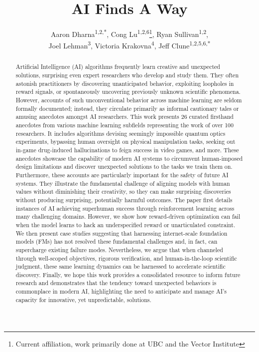 \documentclass[10pt]{article}
\title{AI Finds A Way}
\author{Aaron Dharna\textsuperscript{1,2,*}, Cong Lu\textsuperscript{1,2,6}\footnote[2]{Current affiliation, work primarily done at UBC and the Vector Institute}, 
Ryan Sullivan\textsuperscript{1,2},\\ 
Joel Lehman\textsuperscript{3}, Victoria Krakovna\textsuperscript{4}, Jeff Clune\textsuperscript{1,2,5,6\textdagger,*}}
\date{}
\begin{document}
\maketitle

\begin{abstract}
Artificial Intelligence (AI) algorithms frequently learn creative and unexpected solutions, surprising even expert researchers who develop and study them.
They often astonish practitioners by discovering unanticipated behavior, exploiting loopholes in reward signals, or spontaneously uncovering previously unknown scientific phenomena.
However, accounts of such unconventional behavior across machine learning are seldom formally documented; instead, they circulate primarily as informal cautionary tales or amusing anecdotes amongst AI researchers.
This work presents 26 curated firsthand anecdotes from various machine learning subfields representing the work of over 100 researchers.
It includes algorithms devising seemingly impossible quantum optics experiments,
bypassing human oversight on physical manipulation tasks, seeking out in-game drug-induced hallucinations to feign success in video games, and more.
These anecdotes showcase the capability of modern AI systems to circumvent human-imposed design limitations and discover unexpected solutions to the tasks we train them on.
Furthermore, these accounts are particularly important for the safety of future AI systems.
They illustrate the fundamental challenge of aligning models with human values without diminishing their creativity, so they can make surprising discoveries without producing surprising, potentially harmful outcomes.
The paper first details instances of AI achieving superhuman success through reinforcement learning across many challenging domains. 
However, we show how reward-driven optimization can fail when the model learns to hack an underspecified reward or unarticulated constraint.
We then present case studies suggesting that harnessing internet-scale foundation models (FMs) has not resolved these fundamental challenges and, in fact, can supercharge existing failure modes.
Nevertheless, we argue that when channeled through well-scoped objectives, rigorous verification, and human-in-the-loop scientific judgment, these same learning dynamics can be harnessed to accelerate scientific discovery.
Finally, we hope this work provides a consolidated resource to inform future research and demonstrates that the tendency toward unexpected behaviors
is commonplace in modern AI, highlighting the need to anticipate and manage AI's capacity for innovative, yet unpredictable, solutions.
\end{abstract}
\end{document}
